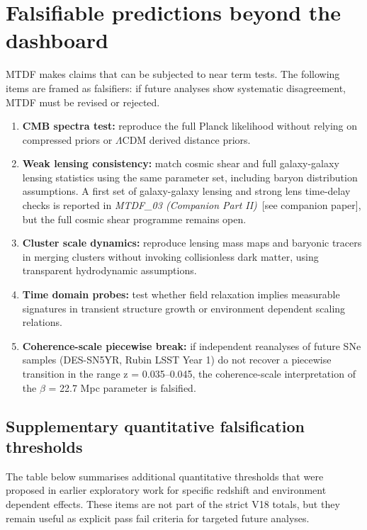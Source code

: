 \documentclass[11pt,a4paper]{article}
\begin{document}
\section{Falsifiable predictions beyond the dashboard}
\label{sec:sec9}
MTDF makes claims that can be subjected to near term tests. The following items are framed as falsifiers: if future analyses show systematic disagreement, MTDF must be revised or rejected.

\begin{enumerate}
  \item \textbf{CMB spectra test:} reproduce the full Planck likelihood without relying on compressed priors or $\Lambda$CDM derived distance priors.
  \item \textbf{Weak lensing consistency:} match cosmic shear and full galaxy-galaxy lensing statistics using the same parameter set, including baryon distribution assumptions. A first set of galaxy-galaxy lensing and strong lens time-delay checks is reported in \textit{MTDF\_\allowbreak{}03 (Companion Part II)}~[see companion paper], but the full cosmic shear programme remains open.
  \item \textbf{Cluster scale dynamics:} reproduce lensing mass maps and baryonic tracers in merging clusters without invoking collisionless dark matter, using transparent hydrodynamic assumptions.
  \item \textbf{Time domain probes:} test whether field relaxation implies measurable signatures in transient structure growth or environment dependent scaling relations.
  \item \textbf{Coherence-scale piecewise break:} if independent reanalyses of future SNe samples (DES-SN5YR, Rubin LSST Year 1) do not recover a piecewise transition in the range z = 0.035--0.045, the coherence-scale interpretation of the $\beta$ = 22.7 Mpc parameter is falsified.
\end{enumerate}

\subsection{Supplementary quantitative falsification thresholds}
The table below summarises additional quantitative thresholds that were proposed in earlier exploratory work for specific redshift and environment dependent effects. These items are not part of the strict V18 totals, but they remain useful as explicit pass fail criteria for targeted future analyses.
\end{document}
